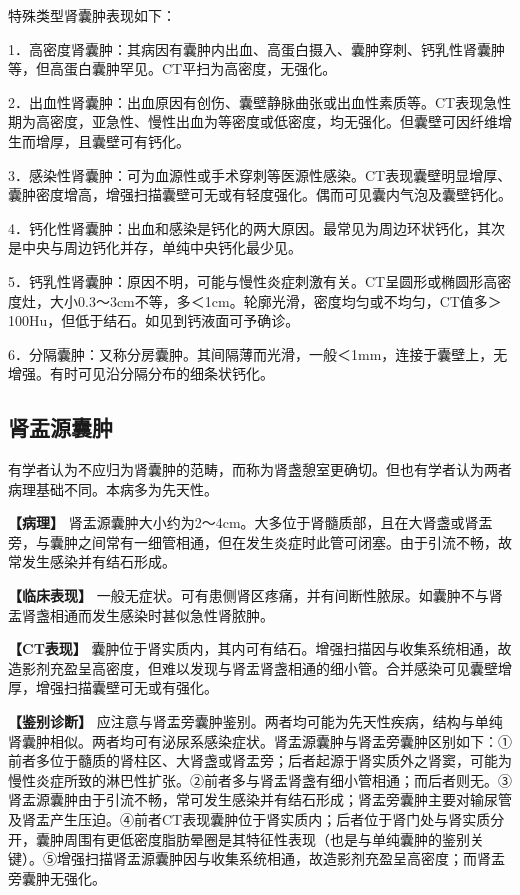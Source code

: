 特殊类型肾囊肿表现如下：

1．高密度肾囊肿：其病因有囊肿内出血、高蛋白摄入、囊肿穿刺、钙乳性肾囊肿等，但高蛋白囊肿罕见。CT平扫为高密度，无强化。

2．出血性肾囊肿：出血原因有创伤、囊壁静脉曲张或出血性素质等。CT表现急性期为高密度，亚急性、慢性出血为等密度或低密度，均无强化。但囊壁可因纤维增生而增厚，且囊壁可有钙化。

3．感染性肾囊肿：可为血源性或手术穿刺等医源性感染。CT表现囊壁明显增厚、囊肿密度增高，增强扫描囊壁可无或有轻度强化。偶而可见囊内气泡及囊壁钙化。

4．钙化性肾囊肿：出血和感染是钙化的两大原因。最常见为周边环状钙化，其次是中央与周边钙化并存，单纯中央钙化最少见。

5．钙乳性肾囊肿：原因不明，可能与慢性炎症刺激有关。CT呈圆形或椭圆形高密度灶，大小0.3～3cm不等，多＜1cm。轮廓光滑，密度均匀或不均匀，CT值多＞100Hu，但低于结石。如见到钙液面可予确诊。

6．分隔囊肿：又称分房囊肿。其间隔薄而光滑，一般＜1mm，连接于囊壁上，无增强。有时可见沿分隔分布的细条状钙化。

\subsection{肾盂源囊肿}

有学者认为不应归为肾囊肿的范畴，而称为肾盏憩室更确切。但也有学者认为两者病理基础不同。本病多为先天性。

\textbf{【病理】}
肾盂源囊肿大小约为2～4cm。大多位于肾髓质部，且在大肾盏或肾盂旁，与囊肿之间常有一细管相通，但在发生炎症时此管可闭塞。由于引流不畅，故常发生感染并有结石形成。

\textbf{【临床表现】}
一般无症状。可有患侧肾区疼痛，并有间断性脓尿。如囊肿不与肾盂肾盏相通而发生感染时甚似急性肾脓肿。

\textbf{【CT表现】}
囊肿位于肾实质内，其内可有结石。增强扫描因与收集系统相通，故造影剂充盈呈高密度，但难以发现与肾盂肾盏相通的细小管。合并感染可见囊壁增厚，增强扫描囊壁可无或有强化。

\textbf{【鉴别诊断】}
应注意与肾盂旁囊肿鉴别。两者均可能为先天性疾病，结构与单纯肾囊肿相似。两者均可有泌尿系感染症状。肾盂源囊肿与肾盂旁囊肿区别如下：①前者多位于髓质的肾柱区、大肾盏或肾盂旁；后者起源于肾实质外之肾窦，可能为慢性炎症所致的淋巴性扩张。②前者多与肾盂肾盏有细小管相通；而后者则无。③肾盂源囊肿由于引流不畅，常可发生感染并有结石形成；肾盂旁囊肿主要对输尿管及肾盂产生压迫。④前者CT表现囊肿位于肾实质内；后者位于肾门处与肾实质分开，囊肿周围有更低密度脂肪晕圈是其特征性表现（也是与单纯囊肿的鉴别关键）。⑤增强扫描肾盂源囊肿因与收集系统相通，故造影剂充盈呈高密度；而肾盂旁囊肿无强化。

